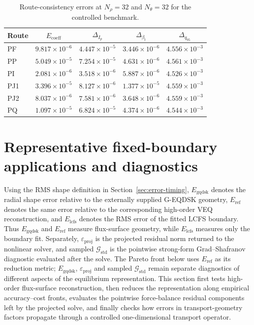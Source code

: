 \documentclass[final, 3p, times]{elsarticle}
\newcommand{\tableformat}{\centering\small}
\begin{document}
\begin{table}[tb]
    \caption{Route-consistency errors at $N_\rho=32$ and $N_\theta=32$ for the controlled benchmark.}
    \tableformat
    \begin{tabular}{l c c c c}
        \hline
        Route & $E_{\mathrm{coeff}}$  & $\Delta_{I_p}$        & $\Delta_{\beta_t}$    & $\Delta_{q_{95}}$     \\
        \hline
        PF    & $9.817\times 10^{-6}$ & $4.447\times 10^{-5}$ & $3.446\times 10^{-6}$ & $4.556\times 10^{-3}$ \\
        PP    & $5.049\times 10^{-5}$ & $7.254\times 10^{-5}$ & $4.631\times 10^{-6}$ & $4.561\times 10^{-3}$ \\
        PI    & $2.081\times 10^{-6}$ & $3.518\times 10^{-6}$ & $5.887\times 10^{-6}$ & $4.526\times 10^{-3}$ \\
        PJ1   & $3.396\times 10^{-5}$ & $8.127\times 10^{-6}$ & $1.377\times 10^{-5}$ & $4.559\times 10^{-3}$ \\
        PJ2   & $8.037\times 10^{-6}$ & $7.581\times 10^{-6}$ & $3.648\times 10^{-6}$ & $4.559\times 10^{-3}$ \\
        PQ    & $1.097\times 10^{-5}$ & $6.824\times 10^{-5}$ & $4.374\times 10^{-6}$ & $4.544\times 10^{-3}$ \\
        \hline
    \end{tabular}
    \label{tab:route-consistency}
\end{table}

\section{Representative fixed-boundary applications and diagnostics}
\label{sec:representative}

Using the RMS shape definition in Section~\ref{sec:error-timing}, $E_{\mathrm{gqdsk}}$ denotes the radial shape error relative to the externally supplied G-EQDSK geometry, $E_{\mathrm{ref}}$ denotes the same error relative to the corresponding high-order VEQ reconstruction, and $E_{\mathrm{lcfs}}$ denotes the RMS error of the fitted LCFS boundary. Thus $E_{\mathrm{gqdsk}}$ and $E_{\mathrm{ref}}$ measure flux-surface geometry, while $E_{\mathrm{lcfs}}$ measures only the boundary fit. Separately, $\varepsilon_{\mathrm{proj}}$ is the projected residual norm returned to the nonlinear solver, and sampled $\mathcal{G}_{\mathrm{std}}$ is the pointwise strong-form Grad--Shafranov diagnostic evaluated after the solve. The Pareto front below uses $E_{\mathrm{ref}}$ as its reduction metric; $E_{\mathrm{gqdsk}}$, $\varepsilon_{\mathrm{proj}}$ and sampled $\mathcal{G}_{\mathrm{std}}$ remain separate diagnostics of different aspects of the equilibrium representation. This section first tests high-order flux-surface reconstruction, then reduces the representation along empirical accuracy--cost fronts, evaluates the pointwise force-balance residual components left by the projected solve, and finally checks how errors in transport-geometry factors propagate through a controlled one-dimensional transport operator.
\end{document}
